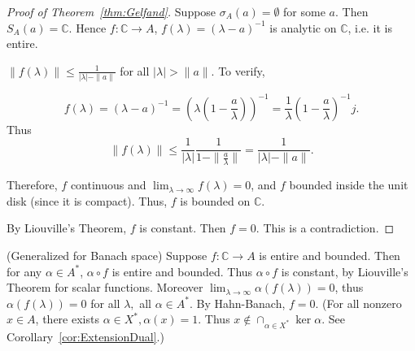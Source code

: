 \begin{proof}[Proof of Theorem~\ref{thm:Gelfand}]

	Suppose $\sigma_A(a) = \emptyset $ for some $a$. Then $S_A(a) = \mathbb{C}$. Hence $f: \mathbb{C} \to A$, $f(\lambda) = (\lambda - a)^{-1}$ is analytic on $\mathbb{C}$, i.e. it is entire. 

	\begin{remark}
		$\|f(\lambda)\| \le \frac{1}{|\lambda| - \|a\|}$ for all $|\lambda| > \|a\|$. To verify,

		\[
			f(\lambda) = (\lambda - a)^{-1} = \left( \lambda(1 - \frac{a}{\lambda}) \right) ^{-1} = \frac{1}{\lambda} (1 - \frac{a}{\lambda})^{-1}j
		.\] 
		Thus
		\[
			\|f(\lambda)\| \le \frac{1}{|\lambda|} \frac{1}{1 - \|\frac{a}{\lambda}\|} = \frac{1}{|\lambda| - \|a\|}
		.\] 
	\end{remark}

	Therefore, $f$ continuous and $\lim_{\lambda \to \infty } f(\lambda) = 0$, and $f$ bounded inside the unit disk (since it is compact). Thus, $f$ is bounded on $\mathbb{C}$.

	By Liouville's Theorem, $f$ is constant. Then $f = 0$. This is a contradiction.
\end{proof}

\begin{remark}(Generalized  for Banach space)
	Suppose $f: \mathbb{C} \to A$ is entire and bounded.
	Then for any $\alpha \in A^*$, $\alpha \circ f$ is entire and bounded. Thus $\alpha \circ f$ is constant, by Liouville's Theorem for scalar functions. Moreover $\lim_{\lambda \to \infty } \alpha (f(\lambda)) = 0$, thus $\alpha(f(\lambda)) = 0$ for all $\lambda, $ all $\alpha \in A^*$. By Hahn-Banach, $f = 0$. (For all nonzero $x \in A$, there exists $\alpha \in X^*, \alpha(x) = 1$. Thus $x \not\in \cap_{\alpha \in X^*} \operatorname{ker} \alpha$. See Corollary~\ref{cor:ExtensionDual}.)
\end{remark}

